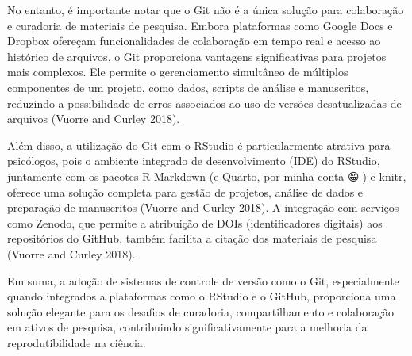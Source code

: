 \documentclass[
  a4paper,
]{article}
\begin{document}
\begin{tcolorbox}
No entanto, é importante notar que o Git não é a única solução para
colaboração e curadoria de materiais de pesquisa. Embora plataformas
como Google Docs e Dropbox ofereçam funcionalidades de colaboração em
tempo real e acesso ao histórico de arquivos, o Git proporciona
vantagens significativas para projetos mais complexos. Ele permite o
gerenciamento simultâneo de múltiplos componentes de um projeto, como
dados, scripts de análise e manuscritos, reduzindo a possibilidade de
erros associados ao uso de versões desatualizadas de arquivos (Vuorre
and Curley 2018).

Além disso, a utilização do Git com o RStudio é particularmente atrativa
para psicólogos, pois o ambiente integrado de desenvolvimento (IDE) do
RStudio, juntamente com os pacotes R Markdown (e Quarto, por minha conta
😁🤣) e knitr, oferece uma solução completa para gestão de projetos,
análise de dados e preparação de manuscritos (Vuorre and Curley 2018). A
integração com serviços como Zenodo, que permite a atribuição de DOIs
(identificadores digitais) aos repositórios do GitHub, também facilita a
citação dos materiais de pesquisa (Vuorre and Curley 2018).

Em suma, a adoção de sistemas de controle de versão como o Git,
especialmente quando integrados a plataformas como o RStudio e o GitHub,
proporciona uma solução elegante para os desafios de curadoria,
compartilhamento e colaboração em ativos de pesquisa, contribuindo
significativamente para a melhoria da reprodutibilidade na ciência.

\end{tcolorbox}
\end{document}
